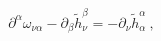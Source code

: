 \begin{equation}
\partial ^{\alpha }\omega _{\nu \alpha }-\partial _{\beta }\tilde{h}_{\nu
}^{\beta }=-\partial _{\nu }\tilde{h}_{\alpha }^{\alpha }\ ,  \label{hh11}
\end{equation}%
